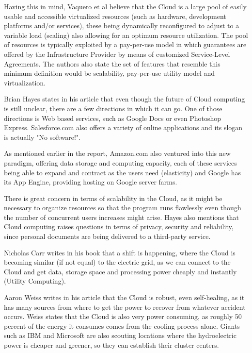 Having this in mind, Vaquero et al believe that the Cloud is a large pool of easily usable and accessible virtualized resources (such as hardware, development platforms and/or services), these being dynamically reconfigured to adjust to a variable load (scaling) also allowing for an optimum resource utilization. The pool of resources is typically exploited by a pay-per-use model in which guarantees are offered by the Infrastructure Provider by means of customized Service-Level Agreements. The authors also state the set of features that resemble this minimum definition would be scalability, pay-per-use utility model and virtualization. \cite{vaquero}

Brian Hayes states in his article that even though the future of Cloud computing is still unclear, there are a few directions in which it can go. One of those directions is Web based services, such as Google Docs or even Photoshop Express. Salesforce.com also offers a variety of online applications and its slogan is actually "No software!". 

As mentioned earlier in the report, Amazon.com also ventured into this new paradigm, offering data storage and computing capacity, each of these services being able to expand and contract as the users need (elasticity) and Google has its App Engine, providing hosting on Google server farms.

There is great concern in terms of scalability in the Cloud, as it might be necessary to organize resources so that the program runs flawlessly even though the number of concurrent users increases might arise. Hayes also mentions that Cloud computing raises questions in terms of privacy, security and reliability, since personal documents are being delivered to a third-party service.\cite{hayes}

Nicholas Carr writes in his book that a shift is happening, where the Cloud is becoming similar (if not equal) to the electric grid, as we can connect to the Cloud and get data, storage space and processing power cheaply and instantly (Utility Computing). \cite{carr}

Aaron Weiss writes in his article that the Cloud is robust, even self-healing, as it has many sources from where to get the power to recover from whatever accident occurs. Weiss states that the Cloud is also very power consuming, as roughly 50 percent of the energy it consumes comes from the cooling process alone. Giants such as IBM and Microsoft are also scouting locations where the hydroelectric power is cheaper and greener, so they can establish their cluster centers.\cite{aaron-clouds}

